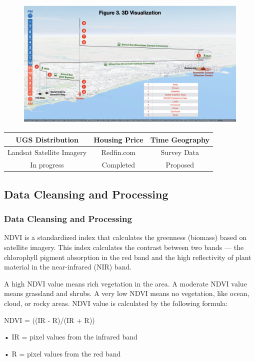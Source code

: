 \documentclass{beamer}
\begin{document}
\begin{frame}
\begin{figure}[h]
\begin{minipage}[t]{0.3\textwidth}
  \end{minipage}\hfill
  \begin{minipage}[t]{0.3\textwidth}
    \centering
    \includegraphics[width=\textwidth]{Visual/timegeo.jpeg}
  \end{minipage}
\end{figure}

\begin{table}
\centering
\begin{tabular}{|c|c|c|}
\hline
\textbf{UGS Distribution} & \textbf{Housing Price} & \textbf{Time Geography} \\
\hline
Landsat Satellite Imagery & Redfin.com & Survey Data \\
\hline
In progress & Completed & Proposed\\
\hline
\end{tabular}
\end{table}
\end{frame}

\subsection{Data Cleansing and Processing}

\begin{frame}
\frametitle{Data Cleansing and Processing}
NDVI is a standardized index that calculates the greenness (biomass) based on satellite imagery. This
index calculates the contrast between two bands — the chlorophyll pigment absorption in the red band and the high reflectivity of plant material in the near-infrared (NIR) band. 

A high NDVI value means rich vegetation in the area. A moderate NDVI value means grassland and shrubs. A very low NDVI means no vegetation, like ocean, cloud, or rocky areas. NDVI value is calculated
by the following formula:

NDVI = ((IR - R)/(IR + R)) 

• IR = pixel values from the infrared band 

• R = pixel values from the red band
\end{frame}
\end{document}
